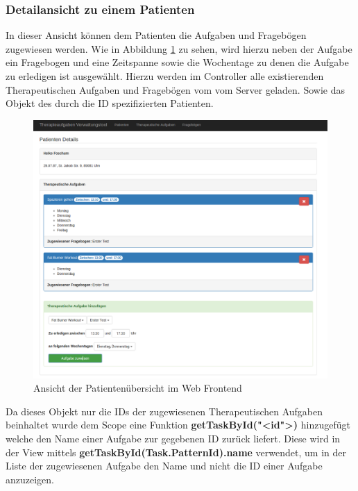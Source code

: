 \subsubsection{Detailansicht zu einem Patienten}\label{_ImpTCPatientDetail}
In dieser Ansicht können dem Patienten die Aufgaben und Fragebögen zugewiesen werden. Wie in Abbildung \ref{PatientDetailsAufgaben} zu sehen, wird hierzu neben der Aufgabe ein Fragebogen und eine Zeitspanne sowie die Wochentage zu denen die Aufgabe zu erledigen ist ausgewählt. Hierzu werden im Controller alle existierenden Therapeutischen Aufgaben und Fragebögen vom vom Server geladen. Sowie das Objekt des durch die ID spezifizierten Patienten.

\begin{figure}[H]
	\centering
	\includegraphics[scale=0.3]{images/Screenshots/PatientDetailsAufgaben}
	\caption[Ansicht der Patientenübersicht im Web Frontend]{Ansicht der Patientenübersicht im Web Frontend}
	\label{PatientDetailsAufgaben}
\end{figure}

Da dieses Objekt nur die IDs der zugewiesenen Therapeutischen Aufgaben beinhaltet wurde dem Scope eine Funktion \textbf{getTaskById("<id">)} hinzugefügt welche den Name einer Aufgabe zur gegebenen ID zurück liefert. Diese wird in der View mittels \textbf{getTaskById(Task.PatternId).name} verwendet, um in der Liste der zugewiesenen Aufgabe den Name und nicht die ID einer Aufgabe anzuzeigen.

